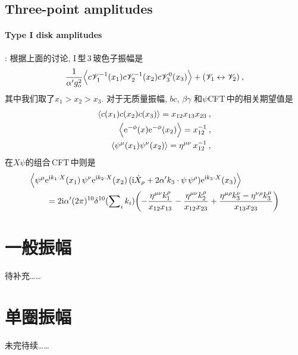 \subsection*{Three-point amplitudes}

\paragraph*{Type I disk amplitudes}: 根据上面的讨论, I\,型\,3\,玻色子振幅是
\begin{equation}
    \frac{1}{\alpha^{\prime}g_{\mathrm{o}}^{2}}\Bigl\langle c\mathscr{V}_{1}^{-1}(x_{1})c\mathscr{V}^{-1}_{2}(x_{2})
    c\mathscr{V}_{3}^{0}(x_{3}) \Bigr\rangle + (\mathscr{V}_{1}\leftrightarrow\mathscr{V}_{2})\:, \label{12.4.1}
\end{equation}
其中我们取了$ x_{1}>x_{2}>x_{3}$. 对于无质量振幅, $bc$, $\beta\gamma$ 和$ \psi $CFT\,中的相关期望值是
\begin{subequations}
\begin{align}
    \langle c(x_{1})c(x_{2})c(x_{3})\rangle =x_{12}x_{13}x_{23} \:, \label{12.4.2a} \\
    \Bigl\langle \mathrm{e}^{-\phi}(x)\mathrm{e}^{-\phi}(x_{2})\Bigr\rangle = x_{12}^{-1} \:, \label{12.4.2b} \\
    \langle \psi^{\mu}(x_{1})\psi^{\nu}(x_{2})\rangle =\eta^{\mu\nu}\,x_{12}^{-1} \:, \label{12.4.2c}
\end{align} \label{12.4.2}
\end{subequations}
在$ X\psi $的组合\,CFT\,中则是
\begin{align}
    &\Bigl\langle \psi^{\mu}\mathrm{e}^{\mathrm{i} k_{1}\cdot X}(x_{1})\,\psi^{\nu}\mathrm{e}^{\mathrm{i} k_{2}\cdot X}(x_{2})\,
    (\mathrm{i} \dot{X}_{\rho}+2\alpha^{\prime}k_{3}\cdot\psi\,\psi^{\rho})\mathrm{e}^{\mathrm{i} k_{3}\cdot X}(x_{3})\Bigr\rangle \nonumber\\
    &\qquad=2\mathrm{i}\alpha^{\prime}(2\pi)^{10}\delta^{10}(\sum\nolimits_{i}k_{i})
    \biggl(-\frac{\eta^{\mu\nu}k_{1}^{\rho}}{x_{12}x_{13}}-\frac{\eta^{\mu\nu}k_{2}^{\rho}}{x_{12}x_{23}}
    +\frac{\eta^{\mu\rho}k_{3}^{\nu}-\eta^{\nu\rho}k_{3}^{\mu}}{x_{13}x_{23}}\biggr) \label{12.4.3}
\end{align}


\section{一般振幅}
待补充……
\section{单圈振幅}
未完待续……